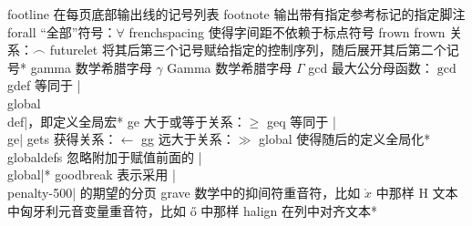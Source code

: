 \capcs footline {在每页底部输出线的记号列表}{}{}
\capcs footnote {输出带有指定参考标记的指定脚注}{}{}
\capcs forall {“全部”符号：$\forall$}{}{}
\capcs frenchspacing {使得字间距不依赖于标点符号}{}{}
\capcs frown {frown 关系：$\frown$}{}{}
\capcs futurelet {将其后第三个记号赋给指定的控制序列，随后展开其后第二个记号}*{}
\capcs gamma {数学希腊字母 $\gamma$}{}{}
\capcs Gamma {数学希腊字母 $\Gamma$}{}{}
\capcs gcd {最大公分母函数：$\gcd$}{}{}
\capcs gdef {等同于 |\\global\\def|，即定义全局宏}*{}
\capcs ge {大于或等于关系：$\ge$}{}{}
\capcs geq {等同于 |\\ge|}{}{}
\capcs gets {获得关系：$\gets$}{}{}
\capcs gg {远大于关系：$\gg$}{}{}
\capcs global {使得随后的定义全局化}*{}
\capcs globaldefs {忽略附加于赋值前面的 |\\global|}*{}
\capcs goodbreak {表示采用 |\\penalty-500| 的期望的分页}{}{}
\capcs grave {数学中的抑间符重音符，比如 $\grave x$ 中那样}{}{}
%
\capcs H {文本中匈牙利元音变量重音符，比如 \H o 中那样}{}{}
\capcs halign {在列中对齐文本}*{}
